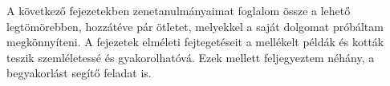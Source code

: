 A következő fejezetekben zenetanulmányaimat foglalom össze a lehető legtömörebben, hozzátéve pár ötletet, melyekkel a saját dolgomat próbáltam megkönnyíteni. A fejezetek elméleti fejtegetéseit a mellékelt példák és kották teszik szemléletessé és gyakorolhatóvá. Ezek mellett feljegyeztem néhány, a begyakorlást segítő feladat is.
